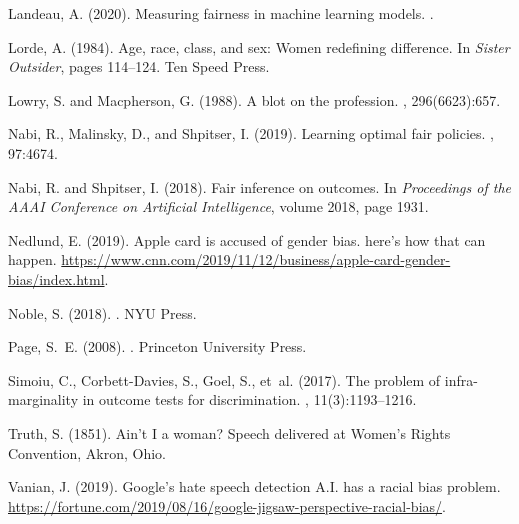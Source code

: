\documentclass[11pt,dvipdfm]{article}
\begin{document}
\begin{thebibliography}{}
	Landeau, A. (2020).
	\newblock Measuring fairness in machine learning models.
	.
	
	Lorde, A. (1984).
	\newblock Age, race, class, and sex: Women redefining difference.
	\newblock In {\em Sister Outsider}, pages 114--124. Ten Speed Press.
	
	Lowry, S. and Macpherson, G. (1988).
	\newblock A blot on the profession.
	, 296(6623):657.
	
	Nabi, R., Malinsky, D., and Shpitser, I. (2019).
	\newblock Learning optimal fair policies.
	, 97:4674.
	
	Nabi, R. and Shpitser, I. (2018).
	\newblock Fair inference on outcomes.
	\newblock In {\em Proceedings of the AAAI Conference on Artificial
		Intelligence}, volume 2018, page 1931.
	
	Nedlund, E. (2019).
	\newblock Apple card is accused of gender bias. here's how that can happen.
	\url{https://www.cnn.com/2019/11/12/business/apple-card-gender-bias/index.html}.
	
	Noble, S. (2018).
	.
	\newblock NYU Press.
	
	Page, S.~E. (2008).
	.
	\newblock Princeton University Press.
	
	Simoiu, C., Corbett-Davies, S., Goel, S., et~al. (2017).
	\newblock The problem of infra-marginality in outcome tests for discrimination.
	, 11(3):1193--1216.
	
	Truth, S. (1851).
	\newblock Ain't {I} a woman?
	\newblock Speech delivered at Women's Rights Convention, Akron, Ohio.
	
	Vanian, J. (2019).
	\newblock Google’s hate speech detection {A.I.} has a racial bias problem.
	\url{https://fortune.com/2019/08/16/google-jigsaw-perspective-racial-bias/}.
	

\end{thebibliography}
\end{document}
